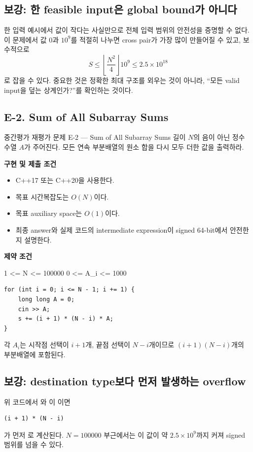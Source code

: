 \subsection{보강: 한 feasible input은 global bound가 아니다}
한 입력 예시에서 값이 작다는 사실만으로 전체 입력 범위의 안전성을 증명할 수 없다. 이 문제에서 값 $0$과 $10^9$를 적절히 나누면 cross pair가 가장 많이 만들어질 수 있고, 보수적으로
\[
S\le \left\lfloor\frac{N^2}{4}\right\rfloor10^9
\le2.5\times10^{18}
\]
로 잡을 수 있다. 중요한 것은 정확한 최대 구조를 외우는 것이 아니라, ``모든 valid input을 덮는 상계인가?''를 확인하는 것이다.

\subsection{E-2. Sum of All Subarray Sums}
\begin{problembox}{중간평가 재평가 문제 E-2 --- Sum of All Subarray Sums}
길이 $N$의 음이 아닌 정수 수열 $A$가 주어진다. 모든 연속 부분배열의 원소 합을 다시 모두 더한 값을 출력하라.

\textbf{구현 및 제출 조건}
\begin{itemize}
  \item C++17 또는 C++20을 사용한다.
  \item 목표 시간복잡도는 $O(N)$이다.
  \item 목표 auxiliary space는 $O(1)$이다.
  \item 최종 answer와 실제 코드의 intermediate expression이 signed 64-bit에서 안전한지 설명한다.
\end{itemize}

\textbf{제약 조건}
\begin{TextBlock}
1 <= N <= 100000
0 <= A_i <= 1000
\end{TextBlock}
\end{problembox}

\begin{answerbox}
\begin{lstlisting}
for (int i = 0; i <= N - 1; i += 1) {
    long long A = 0;
    cin >> A;
    s += (i + 1) * (N - i) * A;
}
\end{lstlisting}

각 $A_i$는 시작점 선택이 $i+1$개, 끝점 선택이 $N-i$개이므로 $(i+1)(N-i)$개의 부분배열에 포함된다.
\end{answerbox}

\subsection{보강: destination type보다 먼저 발생하는 overflow}
위 코드에서 와 이 이면
\begin{lstlisting}
(i + 1) * (N - i)
\end{lstlisting}
가 먼저 로 계산된다. $N=100000$ 부근에서는 이 값이 약 $2.5\times10^9$까지 커져 signed  범위를 넘을 수 있다.

